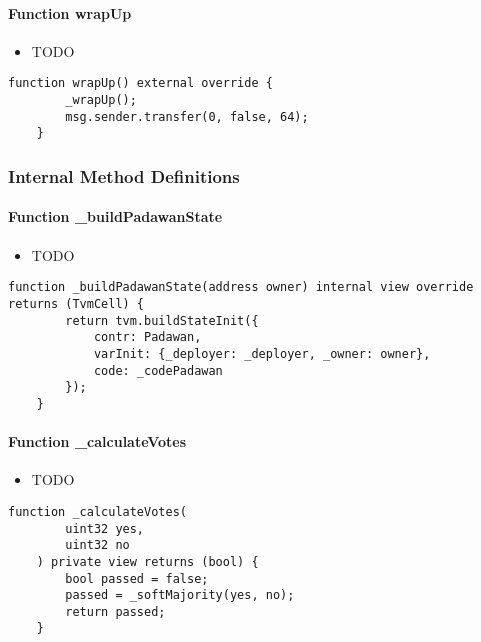 \paragraph{Function wrapUp}

\begin{itemize}
\item TODO
\end{itemize}

\begin{lstlisting}[firstnumber=49]
    function wrapUp() external override {
        _wrapUp();
        msg.sender.transfer(0, false, 64);
    }
\end{lstlisting}

\subsubsection{Internal Method Definitions}


\paragraph{Function \_{}buildPadawanState}

\begin{itemize}
\item TODO
\end{itemize}

\begin{lstlisting}[firstnumber=154]
    function _buildPadawanState(address owner) internal view override returns (TvmCell) {
        return tvm.buildStateInit({
            contr: Padawan,
            varInit: {_deployer: _deployer, _owner: owner},
            code: _codePadawan
        });
    }
\end{lstlisting}

\paragraph{Function \_{}calculateVotes}

\begin{itemize}
\item TODO
\end{itemize}

\begin{lstlisting}[firstnumber=132]
    function _calculateVotes(
        uint32 yes,
        uint32 no
    ) private view returns (bool) {
        bool passed = false;
        passed = _softMajority(yes, no);
        return passed;
    }
\end{lstlisting}

